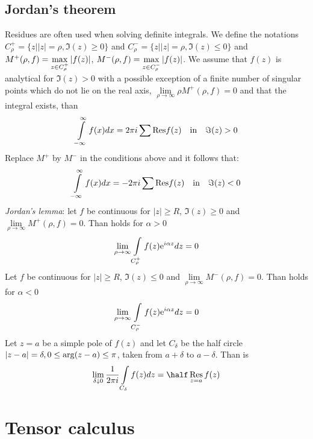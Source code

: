 \section{Jordan's theorem}
Residues are often used when solving definite integrals. We define the notations
$C_\rho^+=\{z||z|=\rho,\Im(z)\geq0\}$ and $C_\rho^-=\{z||z|=\rho,\Im(z)\leq0\}$
and $M^+(\rho,f)=\mathop{\rm max}\limits_{z\in C_\rho^+}|f(z)|$,
$M^-(\rho,f)=\mathop{\rm max}\limits_{z\in C_\rho^-}|f(z)|$. We assume that
$f(z)$ is analytical for $\Im(z)>0$ with a possible exception of a finite number
of singular points which do not lie on the real axis,
$\lim\limits_{\rho\rightarrow\infty}\rho M^+(\rho,f)=0$ and that the integral
exists, than
\[
\int\limits_{-\infty}^\infty f(x)dx=2\pi i\sum{\rm Res}f(z)~~~\mbox{in}~~~\Im(z)>0
\]
Replace $M^+$ by $M^-$ in the conditions above and it follows that:
\[
\int\limits_{-\infty}^\infty f(x)dx=-2\pi i\sum{\rm Res}f(z)~~~\mbox{in}~~~\Im(z)<0
\]
{\it Jordan's lemma}: let $f$ be continuous for $|z|\geq R$, $\Im(z)\geq0$ and
$\lim\limits_{\rho\rightarrow\infty}M^+(\rho,f)=0$. Than holds for $\alpha>0$
\[
\lim_{\rho\rightarrow\infty}\int\limits_{C_\rho^+}f(z){\rm e}^{i\alpha z}dz=0
\]
Let $f$ be continuous for $|z|\geq R$, $\Im(z)\leq0$ and
$\lim\limits_{\rho\rightarrow\infty}M^-(\rho,f)=0$. Than holds for $\alpha<0$
\[
\lim_{\rho\rightarrow\infty}\int\limits_{C_\rho^-}f(z){\rm e}^{i\alpha z}dz=0
\]
Let $z=a$ be a simple pole of $f(z)$ and let $C_\delta$ be the half circle
$|z-a|=\delta,0\leq{\rm arg}(z-a)\leq\pi$, taken from $a+\delta$ to
$a-\delta$. Than is
\[
\lim_{\delta\downarrow0}\frac{1}{2\pi i}\int\limits_{C_\delta}f(z)dz=\half\mathop{\rm Res}\limits_{z=a}f(z)
\]


\chapter{Tensor calculus}
